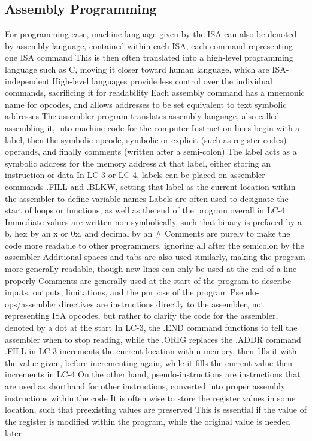 \documentclass[11 pt, twoside]{article}
\newenvironment{outline*}
{
	\begin{outline}[enumerate]
	}
	{\end{outline}
}
\begin{document}
\subsection{Assembly Programming}
\begin{outline*}
\1 For programming-ease, machine language given by the ISA can also be denoted by assembly language, contained within each ISA, each command representing one ISA command
\2 This is then often translated into a high-level programming language such as C, moving it closer toward human language, which are ISA-independent
\3 High-level languages provide less control over the individual commands, sacrificing it for readability
\2 Each assembly command has a mnemonic name for opcodes, and allows addresses to be set equivalent to text symbolic addresses
\1 The assembler program translates assembly language, also called assembling it, into machine code for the computer
\1 Instruction lines begin with a label, then the symbolic opcode, symbolic or explicit (such as register codes) operands, and finally comments (written after a semi-colon)
\2 The label acts as a symbolic address for the memory address at that label, either storing an instruction or data
\3 In LC-3 or LC-4, labels can be placed on assembler commands .FILL and .BLKW, setting that label as the current location within the assembler to define variable names
\3 Labels are often used to designate the start of loops or functions, as well as the end of the program overall in LC-4
\2 Immediate values are written non-symbolically, such that binary is prefaced by a b, hex by an x or 0x, and decimal by an \#
\2 Comments are purely to make the code more readable to other programmers, ignoring all after the semicolon by the assembler
\3 Additional spaces and tabs are also used similarly, making the program more generally readable, though new lines can only be used at the end of a line properly
\3 Comments are generally used at the start of the program to describe inputs, outputs, limitations, and the purpose of the program
\1 Pseudo-ops/assembler directives are instructions directly to the assembler, not representing ISA opcodes, but rather to clarify the code for the assembler, denoted by a dot at the start
\2 In LC-3, the .END command functions to tell the assembler when to stop reading, while the .ORIG replaces the .ADDR command
\2 .FILL in LC-3 increments the current location within memory, then fills it with the value given, before incrementing again, while it fills the current value then increments in LC-4
\2 On the other hand, pseudo-instructions are instructions that are used as shorthand for other instructions, converted into proper assembly instructions within the code
\1 It is often wise to store the register values in some location, such that preexisting values are preserved
\2 This is essential if the value of the register is modified within the program, while the original value is needed later
\end{outline*}
\end{document}
